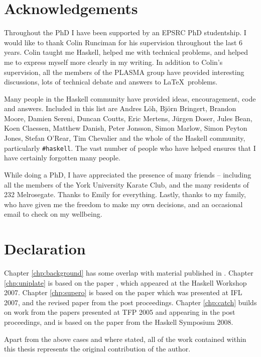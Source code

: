\tableofcontents
\listoffigures
\listoftables

\chapter*{Acknowledgements}

Throughout the PhD I have been supported by an EPSRC PhD studentship. I would like to thank Colin Runciman for his supervision throughout the last 6 years. Colin taught me Haskell, helped me with technical problems, and helped me to express myself more clearly in my writing. In addition to Colin's supervision, all the members of the PLASMA group have provided interesting discussions, lots of technical debate and answers to \LaTeX\ problems.

Many people in the Haskell community have provided ideas, encouragement, code and answers. Included in this list are Andres L\"{o}h, Bj\"{o}rn Bringert, Brandon Moore, Damien Sereni, Duncan Coutts, Eric Mertens, J\"{u}rgen Doser, Jules Bean, Koen Claessen, Matthew Danish, Peter Jonsson, Simon Marlow, Simon Peyton Jones, Stefan O'Rear, Tim Chevalier and the whole of the Haskell community, particularly \verb"#haskell". The vast number of people who have helped ensures that I have certainly forgotten many people.

While doing a PhD, I have appreciated the presence of many friends -- including all the members of the York University Karate Club, and the many residents of 232 Melrosegate. Thanks to Emily for everything. Lastly, thanks to my family, who have given me the freedom to make my own decisions, and an occasional email to check on my wellbeing.

\chapter*{Declaration}

Chapter \ref{chp:background} has some overlap with material published in \cite{me:yhc_core}. Chapter \ref{chp:uniplate} is based on the paper \cite{me:uniplate}, which appeared at the Haskell Workshop 2007. Chapter \ref{chp:supero} is based on the paper \cite{me:supero_ifl} which was presented at IFL 2007, and the revised paper \cite{me:supero} from the post proceedings. Chapter \ref{chp:catch} builds on work from the papers \cite{me:catch_tfp_original,me:catch_tfp} presented at TFP 2005 and appearing in the post proceedings, and is based on the paper \cite{me:catch} from the Haskell Symposium 2008.

Apart from the above cases and where stated, all of the work contained within this thesis represents the original contribution of the author.
